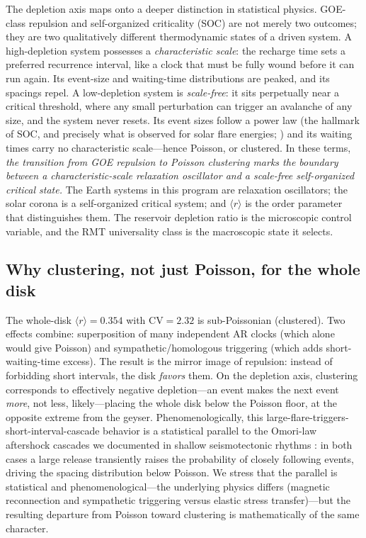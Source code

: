 \documentclass[12pt,a4paper]{article}
\begin{document}
The depletion axis maps onto a deeper distinction in statistical physics. GOE-class repulsion and self-organized criticality (SOC) are not merely two outcomes; they are two qualitatively different thermodynamic states of a driven system. A high-depletion system possesses a \emph{characteristic scale}: the recharge time sets a preferred recurrence interval, like a clock that must be fully wound before it can run again. Its event-size and waiting-time distributions are peaked, and its spacings repel. A low-depletion system is \emph{scale-free}: it sits perpetually near a critical threshold, where any small perturbation can trigger an avalanche of any size, and the system never resets. Its event sizes follow a power law (the hallmark of SOC, and precisely what is observed for solar flare energies; \citealp{lu1991,aschwanden2011}) and its waiting times carry no characteristic scale---hence Poisson, or clustered. In these terms, \emph{the transition from GOE repulsion to Poisson clustering marks the boundary between a characteristic-scale relaxation oscillator and a scale-free self-organized critical state.} The Earth systems in this program are relaxation oscillators; the solar corona is a self-organized critical system; and $\langle r\rangle$ is the order parameter that distinguishes them. The reservoir depletion ratio is the microscopic control variable, and the RMT universality class is the macroscopic state it selects.

\subsection{Why clustering, not just Poisson, for the whole disk}

The whole-disk $\langle r\rangle=0.354$ with $\mathrm{CV}=2.32$ is sub-Poissonian (clustered). Two effects combine: superposition of many independent AR clocks (which alone would give Poisson) and sympathetic/homologous triggering (which adds short-waiting-time excess). The result is the mirror image of repulsion: instead of forbidding short intervals, the disk \emph{favors} them. On the depletion axis, clustering corresponds to effectively negative depletion---an event makes the next event \emph{more}, not less, likely---placing the whole disk below the Poisson floor, at the opposite extreme from the geyser. Phenomenologically, this large-flare-triggers-short-interval-cascade behavior is a statistical parallel to the Omori-law aftershock cascades we documented in shallow seismotectonic rhythms \citep{chen2026fault}: in both cases a large release transiently raises the probability of closely following events, driving the spacing distribution below Poisson. We stress that the parallel is statistical and phenomenological---the underlying physics differs (magnetic reconnection and sympathetic triggering versus elastic stress transfer)---but the resulting departure from Poisson toward clustering is mathematically of the same character.
\end{document}

